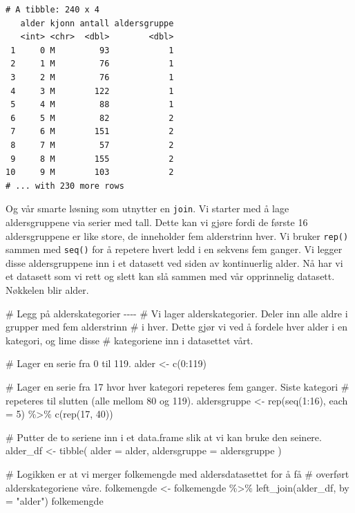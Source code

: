 \documentclass[
  letterpaper,
  DIV=11,
  numbers=noendperiod]{scrreprt}
\newenvironment{Shaded}{\begin{snugshade}}{\end{snugshade}}
\newcommand{\AttributeTok}[1]{\textcolor[rgb]{0.40,0.45,0.13}{#1}}
\newcommand{\CommentTok}[1]{\textcolor[rgb]{0.37,0.37,0.37}{#1}}
\newcommand{\DecValTok}[1]{\textcolor[rgb]{0.68,0.00,0.00}{#1}}
\newcommand{\FunctionTok}[1]{\textcolor[rgb]{0.28,0.35,0.67}{#1}}
\newcommand{\NormalTok}[1]{\textcolor[rgb]{0.00,0.23,0.31}{#1}}
\newcommand{\OtherTok}[1]{\textcolor[rgb]{0.00,0.23,0.31}{#1}}
\newcommand{\SpecialCharTok}[1]{\textcolor[rgb]{0.37,0.37,0.37}{#1}}
\newcommand{\StringTok}[1]{\textcolor[rgb]{0.13,0.47,0.30}{#1}}
\begin{document}
\begin{verbatim}
# A tibble: 240 x 4
   alder kjonn antall aldersgruppe
   <int> <chr>  <dbl>        <dbl>
 1     0 M         93            1
 2     1 M         76            1
 3     2 M         76            1
 4     3 M        122            1
 5     4 M         88            1
 6     5 M         82            2
 7     6 M        151            2
 8     7 M         57            2
 9     8 M        155            2
10     9 M        103            2
# ... with 230 more rows
\end{verbatim}

Og vår smarte løsning som utnytter en \texttt{join}. Vi starter med å
lage aldersgruppene via serier med tall. Dette kan vi gjøre fordi de
første 16 aldersgruppene er like store, de inneholder fem alderstrinn
hver. Vi bruker \texttt{rep()} sammen med \texttt{seq()} for å repetere
hvert ledd i en sekvens fem ganger. Vi legger disse aldersgruppene inn i
et datasett ved siden av kontinuerlig alder. Nå har vi et datasett som
vi rett og slett kan slå sammen med vår opprinnelig datasett. Nøkkelen
blir alder.

\begin{Shaded}
\begin{Highlighting}[]
\CommentTok{\# Legg på alderskategorier {-}{-}{-}{-}}
\CommentTok{\# Vi lager alderskategorier. Deler inn alle aldre i grupper med fem alderstrinn}
\CommentTok{\# i hver. Dette gjør vi ved å fordele hver alder i en kategori, og lime disse}
\CommentTok{\# kategoriene inn i datasettet vårt.}

\CommentTok{\# Lager en serie fra 0 til 119.}
\NormalTok{alder }\OtherTok{\textless{}{-}} \FunctionTok{c}\NormalTok{(}\DecValTok{0}\SpecialCharTok{:}\DecValTok{119}\NormalTok{)}

\CommentTok{\# Lager en serie fra 17 hvor hver kategori repeteres fem ganger. Siste kategori}
\CommentTok{\# repeteres til slutten (alle mellom 80 og 119).}
\NormalTok{aldersgruppe }\OtherTok{\textless{}{-}} \FunctionTok{rep}\NormalTok{(}\FunctionTok{seq}\NormalTok{(}\DecValTok{1}\SpecialCharTok{:}\DecValTok{16}\NormalTok{), }\AttributeTok{each =} \DecValTok{5}\NormalTok{) }\SpecialCharTok{\%\textgreater{}\%} 
  \FunctionTok{c}\NormalTok{(}\FunctionTok{rep}\NormalTok{(}\DecValTok{17}\NormalTok{, }\DecValTok{40}\NormalTok{))}

\CommentTok{\# Putter de to seriene inn i et data.frame slik at vi kan bruke den seinere.}
\NormalTok{alder\_df }\OtherTok{\textless{}{-}} \FunctionTok{tibble}\NormalTok{(}
  \AttributeTok{alder =}\NormalTok{ alder,}
  \AttributeTok{aldersgruppe =}\NormalTok{ aldersgruppe}
\NormalTok{)}

\CommentTok{\# Logikken er at vi merger folkemengde med aldersdatasettet for å få }
\CommentTok{\# overført alderskategoriene våre.}
\NormalTok{folkemengde }\OtherTok{\textless{}{-}}\NormalTok{ folkemengde }\SpecialCharTok{\%\textgreater{}\%} 
  \FunctionTok{left\_join}\NormalTok{(alder\_df, }
            \AttributeTok{by =} \StringTok{"alder"}\NormalTok{)}
\NormalTok{folkemengde}
\end{Highlighting}
\end{Shaded}
\end{document}
